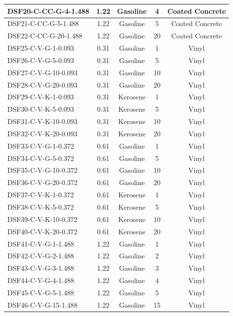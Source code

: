\begin{table}[p]
\begin{center}
\begin{tabular}{|l|c|c|c|c|}
DSF20-C-CC-G-4-1.488   & 1.22  & Gasoline  & 4  & Coated Concrete   \\ \hline
DSF21-C-CC-G-5-1.488   & 1.22  & Gasoline  & 5  & Coated Concrete   \\ \hline
DSF22-C-CC-G-20-1.488  & 1.22  & Gasoline  & 20 & Coated Concrete   \\ \hline
DSF25-C-V-G-1-0.093    & 0.31  & Gasoline  & 1  & Vinyl             \\ \hline
DSF26-C-V-G-5-0.093    & 0.31  & Gasoline  & 5  & Vinyl             \\ \hline
DSF27-C-V-G-10-0.093   & 0.31  & Gasoline  & 10 & Vinyl             \\ \hline
DSF28-C-V-G-20-0.093   & 0.31  & Gasoline  & 20 & Vinyl             \\ \hline
DSF29-C-V-K-1-0.093    & 0.31  & Kerosene  & 1  & Vinyl             \\ \hline
DSF30-C-V-K-5-0.093    & 0.31  & Kerosene  & 5  & Vinyl             \\ \hline
DSF31-C-V-K-10-0.093   & 0.31  & Kerosene  & 10 & Vinyl             \\ \hline
DSF32-C-V-K-20-0.093   & 0.31  & Kerosene  & 20 & Vinyl             \\ \hline
DSF33-C-V-G-1-0.372    & 0.61  & Gasoline  & 1  & Vinyl             \\ \hline
DSF34-C-V-G-5-0.372    & 0.61  & Gasoline  & 5  & Vinyl             \\ \hline
DSF35-C-V-G-10-0.372   & 0.61  & Gasoline  & 10 & Vinyl             \\ \hline
DSF36-C-V-G-20-0.372   & 0.61  & Gasoline  & 20 & Vinyl             \\ \hline
DSF37-C-V-K-1-0.372    & 0.61  & Kerosene  & 1  & Vinyl             \\ \hline
DSF38-C-V-K-5-0.372    & 0.61  & Kerosene  & 5  & Vinyl             \\ \hline
DSF39-C-V-K-10-0.372   & 0.61  & Kerosene  & 10 & Vinyl             \\ \hline
DSF40-C-V-K-20-0.372   & 0.61  & Kerosene  & 20 & Vinyl             \\ \hline
DSF41-C-V-G-1-1.488    & 1.22  & Gasoline  & 1  & Vinyl             \\ \hline
DSF42-C-V-G-2-1.488    & 1.22  & Gasoline  & 2  & Vinyl             \\ \hline
DSF43-C-V-G-3-1.488    & 1.22  & Gasoline  & 3  & Vinyl             \\ \hline
DSF44-C-V-G-4-1.488    & 1.22  & Gasoline  & 4  & Vinyl             \\ \hline
DSF45-C-V-G-5-1.488    & 1.22  & Gasoline  & 5  & Vinyl             \\ \hline
DSF46-C-V-G-15-1.488   & 1.22  & Gasoline  & 15 & Vinyl             \\ \hline
\end{tabular}
\end{center}
\label{DoJ_HAI_Matrix}
\end{table}

